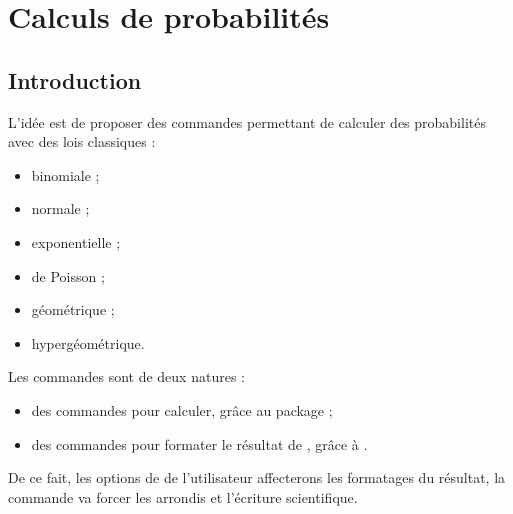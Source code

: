 \begin{PresCodePL}{}
\end{PresCodePL}

\begin{PresCodePL}{}
\end{PresCodePL}

\begin{PresCodePL}{}
\end{PresCodePL}

\begin{PresCodePL}{}
\end{PresCodePL}

\begin{PresCodePL}{}
\end{PresCodePL}

\newpage

\section{Calculs de probabilités}\label{calcprobas}

\subsection{Introduction}

\begin{tipblock}
L'idée est de proposer des commandes permettant de calculer des probabilités avec des lois classiques :

\begin{itemize}
	\item binomiale ;
	\item normale ;
	\item exponentielle ;
	\item de Poisson ;
	\item géométrique ;
	\item hypergéométrique.
\end{itemize}
\vspace*{-\baselineskip}\leavevmode
\end{tipblock}

\begin{noteblock}
Les commandes sont de deux natures :

\begin{itemize}
	\item des commandes pour calculer, grâce au package  ;
	\item des commandes pour formater le résultat de , grâce à .
\end{itemize}

De ce fait, les options de  de l'utilisateur affecterons les formatages du résultat, la commande va \og forcer \fg{} les arrondis et l'écriture scientifique.
\end{noteblock}

